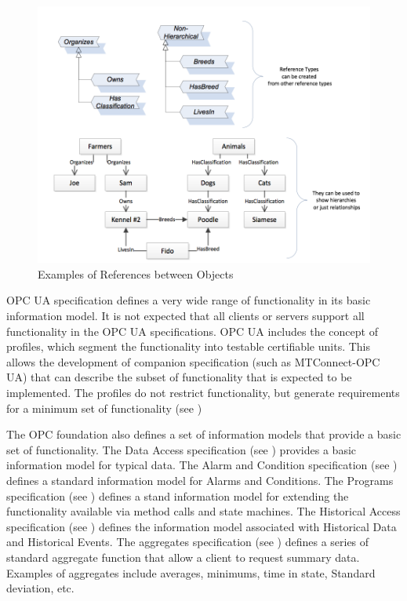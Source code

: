 \begin{figure}[h]
  \centering
  \includegraphics[width=1.0\textwidth]{diagrams/RefsBetweenObjects.png}
  \caption{Examples of References between Objects}
  \label{fig:ref_bet_objs}
\end{figure}

OPC UA specification defines a very wide range of functionality in its basic information model. It is not expected that all clients or servers support all functionality in the OPC UA specifications. OPC UA includes the concept of profiles, which segment the functionality into testable certifiable units. This allows the development of companion specification (such as MTConnect-OPC UA) that can describe the subset of functionality that is expected to be implemented. The profiles do not restrict functionality, but generate requirements for a minimum set of functionality (see \cite{UAPart7})

The OPC foundation also defines a set of information models that provide a basic set of functionality. The Data Access specification (see \cite{UAPart8}) provides a basic information model for typical data. The Alarm and Condition specification (see \cite{UAPart9}) defines a standard information model for Alarms and Conditions. The Programs specification (see \cite{UAPart10}) defines a stand information model for extending the functionality available via method calls and state machines. The Historical Access specification (see \cite{UAPart11}) defines the information model associated with Historical Data and Historical Events. The aggregates specification (see \cite{UAPart13}) defines a series of standard aggregate function that allow a client to request summary data. Examples of aggregates include averages, minimums, time in state, Standard deviation, etc. 

